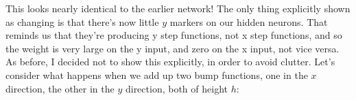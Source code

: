 \documentclass[a4paper,twoside,10pt]{book}
\begin{document}
\begin{center}
\end{center}
%
%
This looks nearly identical to the earlier network! The only thing explicitly shown as changing is that there's now little $y$ markers on our hidden neurons. That reminds us that they're producing y step functions, not x step functions, and so the weight is very large on the y input, and zero on the x input, not vice versa. As before, I decided not to show this explicitly, in order to avoid clutter.
%
Let's consider what happens when we add up two bump functions, one in the $x$ direction, the other in the $y$ direction, both of height $h$:
\end{document}
